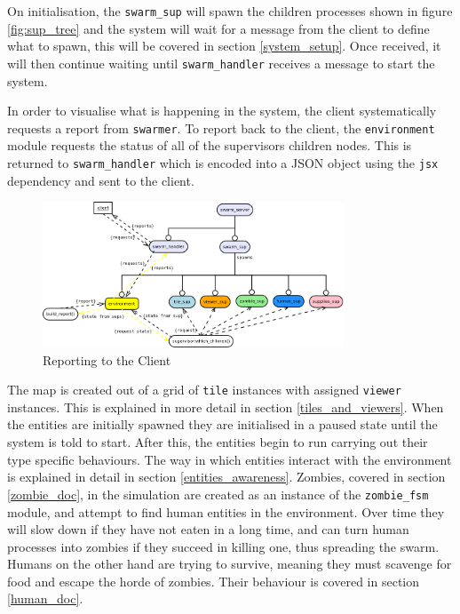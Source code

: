 On initialisation, the \verb+swarm_sup+ will spawn the children processes shown in figure \ref{fig:sup_tree} and the system will wait for a message from the client to define what to spawn, this will be covered in section \ref{system_setup}. Once received, it will then continue waiting until \verb+swarm_handler+ receives a message to start the system.

In order to visualise what is happening in the system, the client systematically requests a report from \verb+swarmer+. To report back to the client, the \verb+environment+ module requests the status of all of the supervisors children nodes. This is returned to \verb+swarm_handler+ which is encoded into a JSON object using the \verb+jsx+ dependency and sent to the client.

\begin{figure}[h]
  \centering
  \includegraphics[width=0.8\textwidth]{img/client_report.png}
\caption{Reporting to the Client}
    \label{fig:client_report}
\end{figure}

The map is created out of a grid of \verb+tile+ instances with assigned \verb+viewer+ instances. This is explained in more detail in section \ref{tiles_and_viewers}. When the entities are initially spawned they are initialised in a paused state until the system is told to start. After this, the entities begin to run carrying out their type specific behaviours. The way in which entities interact with the environment is explained in detail in section \ref{entities_awareness}. Zombies, covered in section \ref{zombie_doc}, in the simulation are created as an instance of the \verb+zombie_fsm+ module, and attempt to find human entities in the environment. Over time they will slow down if they have not eaten in a long time, and can turn human processes into zombies if they succeed in killing one, thus spreading the swarm. Humans on the other hand are trying to survive, meaning they must scavenge for food and escape the horde of zombies. Their behaviour is covered in section \ref{human_doc}.

